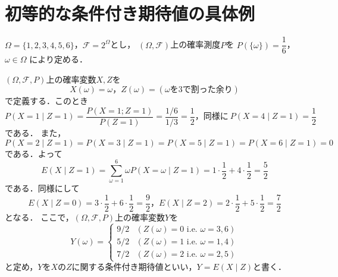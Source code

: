 \documentclass{jsarticle}
\begin{document}
\section*{初等的な条件付き期待値の具体例}

$\Omega=\{1,2,3,4,5,6\}$，$\mathcal{F}=2^\Omega$とし，
$(\Omega,\mathcal{F})$上の確率測度$P$を
$P(\{\omega\})=\dfrac{1}{6}$，$\omega\in\Omega$
により定める．

$(\Omega,\mathcal{F},P)$上の確率変数$X,Z$を
\[ X(\omega)=\omega，Z(\omega)=(\omega\text{を3で割った余り}) \]
で定義する．このとき
\[ P(X=1\mid Z=1)=\frac{P(X=1;Z=1)}{P(Z=1)}=\frac{1/6}{1/3}=\frac{1}{2}，
同様に\ P(X=4\mid Z=1)=\frac{1}{2} \]
である．
また，
\[ P(X=2\mid Z=1)=P(X=3\mid Z=1)=P(X=5\mid Z=1)=P(X=6\mid Z=1)=0 \]
である．よって
\[ E(X\mid Z=1)=\sum_{\omega=1}^6\omega P(X=\omega\mid Z=1)
=1\cdot\frac{1}{2}+4\cdot\frac{1}{2}=\frac{5}{2} \]
である．同様にして
\[ E(X\mid Z=0)=3\cdot\frac{1}{2}+6\cdot\frac{1}{2}=\frac{9}{2}，
E(X\mid Z=2)=2\cdot\frac{1}{2}+5\cdot\frac{1}{2}=\frac{7}{2} \]
となる．
ここで，$(\Omega,\mathcal{F},P)$上の確率変数$Y$を
\[ Y(\omega)=\begin{cases}9/2 & (Z(\omega)=0\text{ i.e. }\omega=3,6) \\
5/2 & (Z(\omega)=1\text{ i.e. }\omega=1,4) \\
7/2 & (Z(\omega)=2\text{ i.e. }\omega=2,5)\end{cases} \]
と定め，$Y$を$X$の$Z$に関する条件付き期待値といい，$Y=E(X\mid Z)$と書く．
\end{document}
